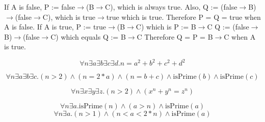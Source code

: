 \documentclass{61200}
\begin{document}
If A is false, P := false$\rightarrow$(B$\rightarrow$C), which is always true.
Also, Q := (false$\rightarrow$B)$\rightarrow$(false$\rightarrow$C), which is
true$\rightarrow$true which is true. Therefore P = Q = true when A is false.
\newline
\newline
If A is true, P := true$\rightarrow$(B$\rightarrow$C) which is P := B$\rightarrow$C
\newline
Q := (false$\rightarrow$B)$\rightarrow$(false$\rightarrow$C) which equals
Q := B$\rightarrow$C
\newline
Therefore Q = P = B$\rightarrow$C when A is true.



\[
\forall n \exists a \exists b \exists c \exists d. n = a^2+b^2+c^2+d^2
\]

\[
\forall n \exists a \exists b \exists c. (n > 2) \land (n = 2*a) \land (n = b + c) \land \text{isPrime}(b) \land \text{isPrime}(c)
\]

\[
\forall n \exists x \exists y \exists z.(n>2) \land (x^n+y^n=z^n)
\]

\[
\forall n \exists a. \text{isPrime}(n) \land (a > n) \land \text{isPrime}(a)
\]
\[
\forall n \exists a. (n>1) \land (n < a < 2*n) \land \text{isPrime}(a)
\]
\end{document}
